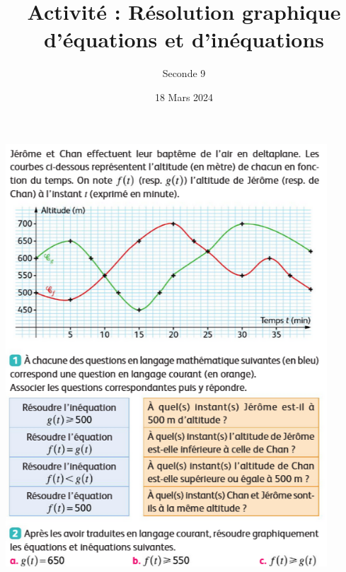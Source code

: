 \documentclass{article}
\title{Activité : Résolution graphique d'équations et d'inéquations}
\author{Seconde 9}
\date{18 Mars 2024}
\begin{document}
\maketitle

\begin{center}
\includegraphics[width=0.9\textwidth]{Activite_equations_graphiques.png}
\end{center}
\end{document}
